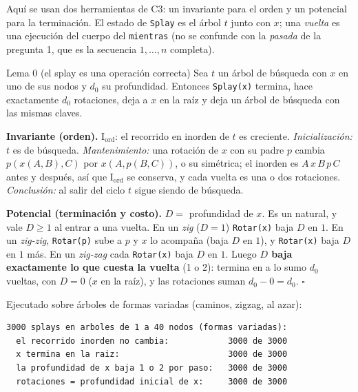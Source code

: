\documentclass[11pt]{article}
\begin{document}
Aquí se usan dos herramientas de C3: un invariante para el orden y un potencial para la terminación. El estado de
\texttt{Splay} es el árbol $t$ junto con $x$; una \emph{vuelta} es una ejecución del cuerpo del \texttt{mientras} (no se confunde con la \emph{pasada} de la pregunta 1, que es la secuencia $1,\dots,n$ completa).

\begin{resultado}{Lema 0 (el splay es una operación correcta)}
Sea $t$ un árbol de búsqueda con $x$ en uno de sus nodos y $d_0$ su profundidad. Entonces \texttt{Splay(x)} termina,
hace exactamente $d_0$ rotaciones, deja a $x$ en la raíz y deja un árbol de búsqueda con las mismas claves.
\end{resultado}

\textbf{Invariante (orden).} $\mathrm{I}_{\text{ord}}$: el recorrido en inorden de $t$ es creciente.
\emph{Inicialización:} $t$ es de búsqueda. \emph{Mantenimiento:} una rotación de $x$ con su padre $p$ cambia
$p(x(A,B),C)$ por $x(A,p(B,C))$, o su simétrica; el inorden es $A\,x\,B\,p\,C$ antes y después, así que
$\mathrm{I}_{\text{ord}}$ se conserva, y cada vuelta es una o dos rotaciones. \emph{Conclusión:} al salir del
ciclo $t$ sigue siendo de búsqueda.

\textbf{Potencial (terminación y costo).} $D=$ profundidad de $x$. Es un natural, y vale $D\ge1$ al entrar a una
vuelta. En un \emph{zig} ($D=1$) \texttt{Rotar(x)} baja $D$ en $1$. En un \emph{zig-zig}, \texttt{Rotar(p)} sube a
$p$ y $x$ lo acompaña (baja $D$ en $1$), y \texttt{Rotar(x)} baja $D$ en $1$ más. En un \emph{zig-zag} cada
\texttt{Rotar(x)} baja $D$ en $1$. Luego \textbf{$D$ baja exactamente lo que cuesta la vuelta} (1 o 2): termina en
a lo sumo $d_0$ vueltas, con $D=0$ ($x$ en la raíz), y las rotaciones suman $d_0-0=d_0$. $\square$

\noindent\begin{minipage}{\linewidth}
Ejecutado sobre árboles de formas variadas (caminos, zigzag, al azar):
\begin{lstlisting}[style=salida,basicstyle=\ttfamily\footnotesize\color{black},columns=fixed]
3000 splays en arboles de 1 a 40 nodos (formas variadas):
  el recorrido inorden no cambia:            3000 de 3000
  x termina en la raiz:                      3000 de 3000
  la profundidad de x baja 1 o 2 por paso:   3000 de 3000
  rotaciones = profundidad inicial de x:     3000 de 3000
\end{lstlisting}
\end{minipage}
\end{document}
